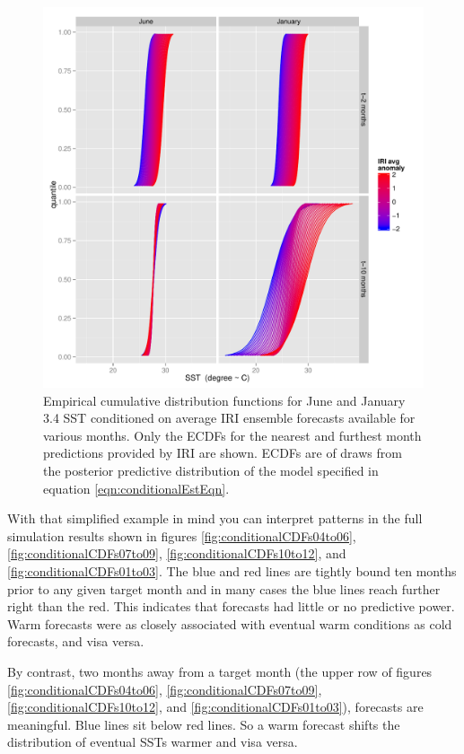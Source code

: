 \documentclass[article]{jss}
\begin{document}
\begin{figure}[!htbp]
  \includegraphics[width=\linewidth]{img/conditionalCDFsIllustrativeExamplesTradConfigFull.pdf}
  \caption{Empirical cumulative distribution functions for June and January  3.4 SST conditioned on average IRI ensemble forecasts available for various months. Only the ECDFs for the nearest and furthest month predictions provided by IRI are shown. ECDFs are of draws from the posterior predictive distribution of the model specified in equation \ref{eqn:conditionalEstEqn}.}
   \label{fig:conditionalCDFsIllustrativeExamplesTradConfigFull}
\end{figure}

With that simplified example in mind you can interpret patterns in the
full simulation results shown in figures
\ref{fig:conditionalCDFs04to06}, \ref{fig:conditionalCDFs07to09},
\ref{fig:conditionalCDFs10to12}, and \ref{fig:conditionalCDFs01to03}.
The blue and red lines are tightly bound ten months prior to any given
target month and in many cases the blue lines reach further right than
the red. This indicates that forecasts had little or no predictive
power. Warm forecasts were as closely associated with eventual warm
conditions as cold forecasts, and visa versa.

By contrast, two months away from a target month (the upper row of
figures \ref{fig:conditionalCDFs04to06},
\ref{fig:conditionalCDFs07to09}, \ref{fig:conditionalCDFs10to12}, and
\ref{fig:conditionalCDFs01to03}), forecasts are meaningful. Blue lines
sit below red lines. So a warm forecast shifts the distribution of
eventual SSTs warmer and visa versa.
\end{document}
